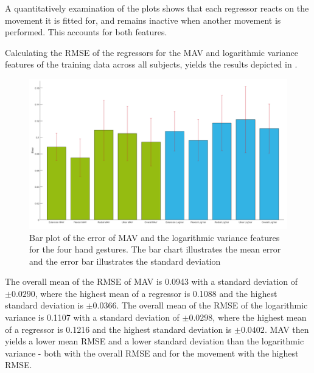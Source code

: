 A quantitatively examination of the plots shows that each regressor reacts on the movement it is fitted for, and remains inactive when another movement is performed. This accounts for both features. 
  


Calculating the RMSE of the regressors for the MAV and logarithmic variance features of the training data across all subjects, yields the results depicted in . 

\begin{figure}[H]
	\includegraphics[width=.7\textwidth]{figures/results/gimmeThemRMSEBars}  %
	\caption{Bar plot of the error of MAV and the logarithmic variance features for the four hand gestures. The bar chart illustrates the mean error and the error bar illustrates the standard deviation}
	\label{fig:gimmeThemRMSEBars}  %
\end{figure}

The overall mean of the RMSE of MAV is 0.0943 with a standard deviation of $\pm 0.0290$, where the highest mean of a regressor is 0.1088 and the highest standard deviation is $\pm 0.0366$. The overall mean of the RMSE of the logarithmic variance is 0.1107 with a standard deviation of $\pm 0.0298$, where the highest mean of a regressor is 0.1216 and the highest standard deviation is $\pm 0.0402$. MAV then yields a lower mean RMSE and a lower standard deviation than the logarithmic variance - both with the overall RMSE and for the movement with the highest RMSE. 